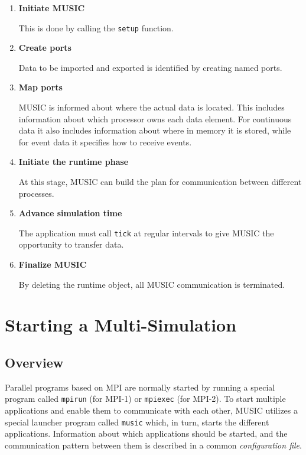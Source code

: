 \documentclass[a4paper]{report}
\begin{document}
\begin{enumerate}
\item \textbf{Initiate MUSIC}

  This is done by calling the \lstinline!setup! function.
\item \textbf{Create ports}

  Data to be imported and exported is identified by creating named
  ports.
\item \textbf{Map ports}

  MUSIC is informed about where the actual data is located.  This
  includes information about which processor owns each data element.
  For continuous data it also includes information about where in
  memory it is stored, while for event data it specifies how to
  receive events.
\item \textbf{Initiate the runtime phase}

  At this stage, MUSIC can build the plan for communication between
  different processes.
\item \textbf{Advance simulation time}

  The application must call \lstinline!tick! at regular intervals
  to give MUSIC the opportunity to transfer data.
\item \textbf{Finalize MUSIC}

  By deleting the runtime object, all MUSIC communication is terminated.
\end{enumerate}


\chapter{Starting a Multi-Simulation}

\section{Overview}

Parallel programs based on MPI are normally started by running a
special program called \texttt{mpirun} (for MPI-1) or
\texttt{mpiexec} (for MPI-2).  To start multiple
applications and enable them to communicate with each other, MUSIC
utilizes a special launcher program called \texttt{music}
which, in turn, starts the different applications.  Information about
which applications should be started, and the communication pattern
between them is described in a common \emph{configuration
  file}.
\end{document}
